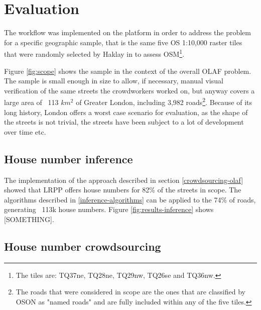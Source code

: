 \section{Evaluation}

The workflow was implemented on the platform in order to address the problem for a specific geographic sample, that is the same five OS 1:10,000 raster tiles that were randomly selected by Haklay in \cite{Haklay:2010vs} to assess OSM\footnote{The tiles are: TQ37ne, TQ28ne, TQ29nw, TQ26se and TQ36nw.}.

Figure \ref{fig:scope} shows the sample in the context of the overall OLAF problem. The sample is small enough in size to allow, if necessary, manual visual verification of the same streets the crowdworkers worked on, but anyway covers a large area of ~113 $ km^2 $ of Greater London, including 3,982 roads\footnote{The roads that were considered in scope are the ones that are classified by OSON as "named roads" and are fully included within any of the five tiles.}. Because of its long history, London offers a worst case scenario for evaluation, as the shape of the streets is not trivial, the streets have been subject to a lot of development over time etc. 

\subsection{House number inference}

The implementation of the approach described in section \ref{crowdsourcing-olaf} showed that LRPP offers house numbers for 82\% of the streets in scope. The algorithms described in \ref{inference-algorithms} can be applied to the 74\% of roads, generating ~113k house numbers. Figure \ref{fig:results-inference} shows [SOMETHING].

\begin{figure}[!ht]
    \begin{floatrow}
   \end{floatrow}
\end{figure}

\subsection{House number crowdsourcing}

